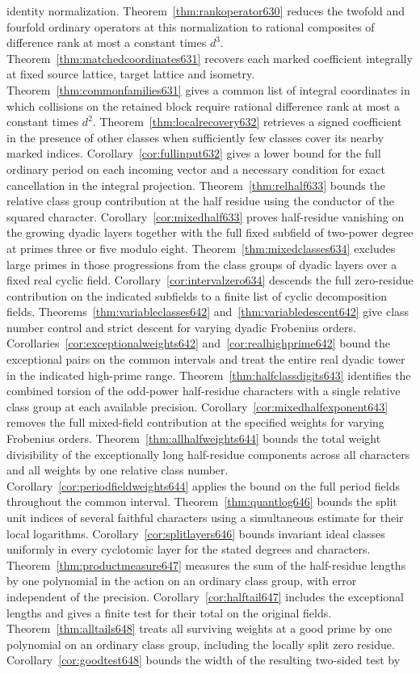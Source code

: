 \documentclass[a4paper,11pt]{article}
\theoremstyle{definition}
\theoremstyle{remark}
\numberwithin{equation}{section}
\begin{document}
identity normalization. Theorem~\ref{thm:rankoperator630} reduces the twofold and fourfold ordinary operators at this normalization to rational composites of difference rank at most a constant times \(d^3\). Theorem~\ref{thm:matchedcoordinates631} recovers each marked coefficient integrally at fixed source lattice, target lattice and isometry. Theorem~\ref{thm:commonfamilies631} gives a common list of integral coordinates in which collisions on the retained block require rational difference rank at most a constant times \(d^2\). Theorem~\ref{thm:localrecovery632} retrieves a signed coefficient in the presence of other classes when sufficiently few classes cover its nearby marked indices. Corollary~\ref{cor:fullinput632} gives a lower bound for the full ordinary period on each incoming vector and a necessary condition for exact cancellation in the integral projection. Theorem~\ref{thm:relhalf633} bounds the relative class group contribution at the half residue using the conductor of the squared character. Corollary~\ref{cor:mixedhalf633} proves half-residue vanishing on the growing dyadic layers together with the full fixed subfield of two-power degree at primes three or five modulo eight. Theorem~\ref{thm:mixedclasses634} excludes large primes in those progressions from the class groups of dyadic layers over a fixed real cyclic field. Corollary~\ref{cor:intervalzero634} descends the full zero-residue contribution on the indicated subfields to a finite list of cyclic decomposition fields. Theorems~\ref{thm:variableclasses642} and~\ref{thm:variabledescent642} give class number control and strict descent for varying dyadic Frobenius orders. Corollaries~\ref{cor:exceptionalweights642} and~\ref{cor:realhighprime642} bound the exceptional pairs on the common intervals and treat the entire real dyadic tower in the indicated high-prime range. Theorem~\ref{thm:halfclassdigits643} identifies the combined torsion of the odd-power half-residue characters with a single relative class group at each available precision. Corollary~\ref{cor:mixedhalfexponent643} removes the full mixed-field contribution at the specified weights for varying Frobenius orders. Theorem~\ref{thm:allhalfweights644} bounds the total weight divisibility of the exceptionally long half-residue components across all characters and all weights by one relative class number. Corollary~\ref{cor:periodfieldweights644} applies the bound on the full period fields throughout the common interval. Theorem~\ref{thm:quantlog646} bounds the split unit indices of several faithful characters using a simultaneous estimate for their local logarithms. Corollary~\ref{cor:splitlayers646} bounds invariant ideal classes uniformly in every cyclotomic layer for the stated degrees and characters. Theorem~\ref{thm:productmeasure647} measures the sum of the half-residue lengths by one polynomial in the action on an ordinary class group, with error independent of the precision. Corollary~\ref{cor:halftail647} includes the exceptional lengths and gives a finite test for their total on the original fields. Theorem~\ref{thm:alltails648} treats all surviving weights at a good prime by one polynomial on an ordinary class group, including the locally split zero residue. Corollary~\ref{cor:goodtest648} bounds the width of the resulting two-sided test by 
\end{document}
